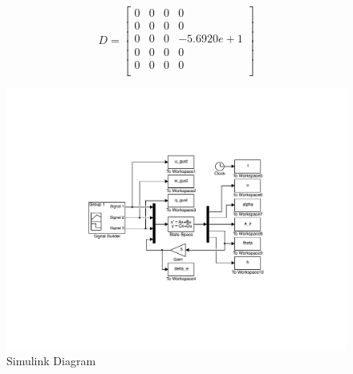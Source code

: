 \documentclass[12pt]{article}
\begin{document}
\begin{equation*}
D =
\begin{bmatrix}
           0 &         0 & 0 & 0 \\
           0 &         0 & 0 & 0 \\
           0 &         0 & 0 & -5.6920e+1 \\
           0 &         0 & 0 & 0 \\
           0 &         0 & 0 & 0 \\
\end{bmatrix}
\end{equation*}


 
% 


\begin{figure}[h]
\begin{center}
\includegraphics[width=1\textwidth]{figures/simulink}
\caption{Simulink Diagram}
\end{center}
\end{figure}
\end{document}
